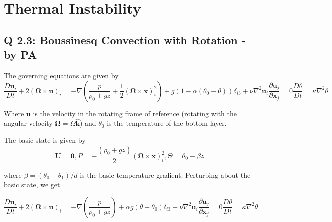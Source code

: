 \chapter{Thermal Instability}
\section{Q 2.3: Boussinesq Convection with Rotation - by PA}
The governing equations are given by
\begin{subequations}
 \begin{equation}
  \frac{D\boldsymbol{u}_{i}}{Dt} + 2 (\boldsymbol{\Omega} \times \boldsymbol{u})_{i} = -\nabla \left(\frac{p}{\rho_{0} + gz} + \frac{1}{2}(\boldsymbol{\Omega} \times \boldsymbol{x})_{i}^{2}\right) + g ( 1 - \alpha  (\theta_{0} - \theta) ) \delta_{i3} + \nu \nabla^{2} \boldsymbol{u}_{i}
 \end{equation}
 \begin{equation}
  \frac{\partial \boldsymbol{u}_{j}}{\partial \boldsymbol{x}_{j}} = 0
 \end{equation}
 \begin{equation}
  \frac{D\theta}{Dt} = \kappa \nabla^{2} \theta
 \end{equation}
\end{subequations}

Where $\boldsymbol{u}$ is the velocity in the rotating frame of reference (rotating with the angular velocity $\boldsymbol{\Omega} = \Omega \boldsymbol{\hat{k}}$) and $\theta_{0}$ is the temperature of the bottom layer.

The basic state is given by
\begin{equation}
 \boldsymbol{U} = \boldsymbol{0}, P = - \frac{(\rho_{0} + gz)}{2} (\boldsymbol{\Omega} \times \boldsymbol{x})_{i}^{2}, \Theta = \theta_{0} - \beta z
\end{equation}

where $\beta = (\theta_{0} - \theta_{1})/d$ is the basic temperature gradient. Perturbing about the basic state, we get

\begin{subequations} \label{eq:2_3_perturbed}
 \begin{equation}\label{eq:2_3_perturbed_mom}
  \frac{D\boldsymbol{u}_{i}}{Dt} + 2 (\boldsymbol{\Omega} \times \boldsymbol{u})_{i} = -\nabla \left(\frac{p}{\rho_{0} + gz}\right) + \alpha g (\theta - \theta_{0}) \delta_{i3} + \nu \nabla^{2} \boldsymbol{u}_{i}
 \end{equation}
 \begin{equation}
  \frac{\partial \boldsymbol{u}_{j}}{\partial \boldsymbol{x}_{j}} = 0
 \end{equation}
 \begin{equation}
  \frac{D\theta}{Dt} = \kappa \nabla^{2} \theta
 \end{equation}
\end{subequations}

